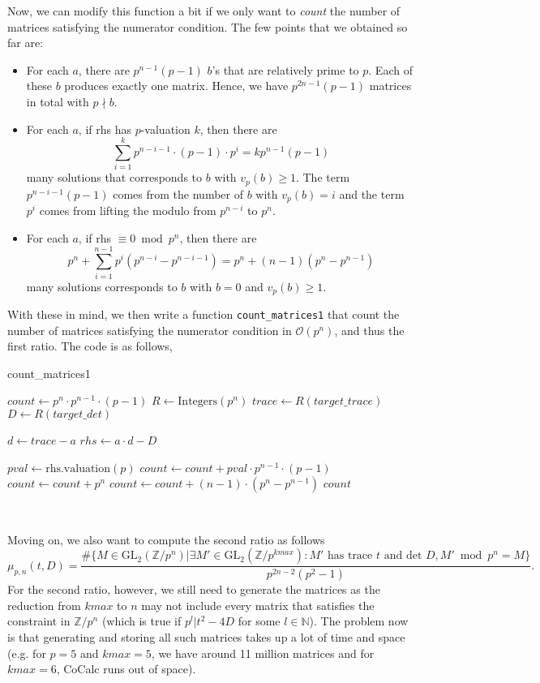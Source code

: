 \documentclass[letterpaper,12pt]{article}
\newcommand{\Z}{\mathbb{Z}}
\newcommand{\bigO}{\mathcal{O}}
\begin{document}
Now, we can modify this function a bit if we only want to \textit{count} the number of matrices
satisfying the numerator condition.
The few points that we obtained so far are:
\begin{itemize}
\item For each $a$, there are $p^{n-1}(p-1)$ $b$'s that are relatively prime to $p$.
Each of these $b$ produces exactly one matrix.
Hence, we have $p^{2n-1}(p-1)$ matrices in total with $p \nmid b$.
\item For each $a$, if rhs has $p$-valuation $k$, then there are 
\[
\sum_{i=1}^k p^{n-i-1} \cdot (p-1) \cdot p^i = k p^{n-1}(p-1)
\]
many solutions that corresponds to $b$ with $v_p(b) \geq 1$.
The term $p^{n-i-1}(p-1)$ comes from the number of $b$
with $v_p(b) = i$
and the term $p^i$ comes from lifting the modulo from $p^{n-i}$ to $p^n$.
\item For each $a$, if rhs $\equiv 0 \bmod p^n$, then there are 
\[
p^n + \sum_{i=1}^{n-1} p^i (p^{n-i} - p^{n-i-1})
= p^n + (n-1) (p^n - p^{n-1})
\]
many solutions corresponds to $b$ with $b = 0$ and $v_p(b) \geq 1$.
\end{itemize}

With these in mind, we then write a function \texttt{count\_matrices1}
that count the number of matrices satisfying the numerator condition in $\bigO(p^n)$,
and thus the first ratio.
The code is as follows,
\begin{algorithm}[H]
\caption{count\_matrices1}
\begin{algorithmic}[1]
    \State $count \gets p^n \cdot p^{n-1} \cdot (p - 1)$
    \State $R \gets \text{Integers}(p^n)$
    \State $trace \gets R(target\_trace)$
    \State $D \gets R(target\_det)$

        \State $d \gets trace - a$
        \State $rhs \gets a \cdot d - D$

            \State $pval \gets \text{rhs.valuation}(p)$
            \State $count \gets count + pval \cdot p^{n-1} \cdot (p - 1)$
        \Else
            \State $count \gets count + p^n$
            \State $count \gets count + (n - 1) \cdot (p^n - p^{n-1})$
        \EndIf
    \EndFor
    \State \Return $count$
\EndFunction
\end{algorithmic}
\end{algorithm}

\

Moving on, we also want to compute the second ratio as follows
\[
\mu_{p,n}(t, D) = \frac{\#\{M \in \text{GL}_2(\Z/p^n)| 
\exists M' \in \text{GL}_2(\Z/p^{kmax}): M' \text{ has trace } t \text{ and det } D, M' \bmod p^n = M\}}
{p^{2n-2}(p^2-1)}.
\]
For the second ratio, however, we still need to generate the matrices 
as the reduction from $kmax$ to $n$ may not include every matrix that satisfies the constraint 
in $\Z / p^n$ (which is true if $p^l | t^2-4D$ for some $l \in \mathbb{N}$).
The problem now is that generating and storing all such matrices takes 
up a lot of time and space (e.g. for $p=5$ and $kmax=5$, we have around 11 million matrices
and for $kmax=6$, CoCalc runs out of space).
\end{document}
